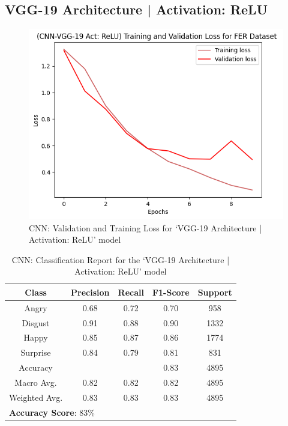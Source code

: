 \documentclass[conference]{IEEEtran}
\begin{document}
      \subsection{VGG-19 Architecture | Activation: ReLU}
        \begin{figure}[h]
          \centering
          \includegraphics[width=\columnwidth]{Figures/FER-2013_VGG19-ReLU_TVL.png}
          \caption{CNN: Validation and Training Loss for `VGG-19 Architecture | Activation: ReLU' model}
          \label{fig:cnnVGG19ReLUTVL}
        \end{figure}

        \begin{table}[h]
          \caption{CNN: Classification Report for the `VGG-19 Architecture | Activation: ReLU' model}
          \label{tab:cnnVGG19ReLUClassificationReport}
          \begin{tabular}{ccccc} 
            \hline
      
            \textbf{Class} & \textbf{Precision} & \textbf{Recall} & \textbf{F1-Score} & \textbf{Support} \\ 
            \hline
            Angry & 0.68 & 0.72 & 0.70 & 958 \\
            Disgust & 0.91 & 0.88 & 0.90 & 1332 \\
            Happy & 0.85 & 0.87 & 0.86 & 1774 \\
            Surprise & 0.84 & 0.79 & 0.81 & 831 \\ \hline
            Accuracy & & & 0.83 & 4895 \\ \hline
            Macro Avg. & 0.82 & 0.82 & 0.82 & 4895 \\ \hline
            Weighted Avg. & 0.83 & 0.83 & 0.83 & 4895 \\ \hline
            \multicolumn{5}{l}{\textbf{Accuracy Score}: 83\%}
          \end{tabular}
        \end{table}
\end{document}
